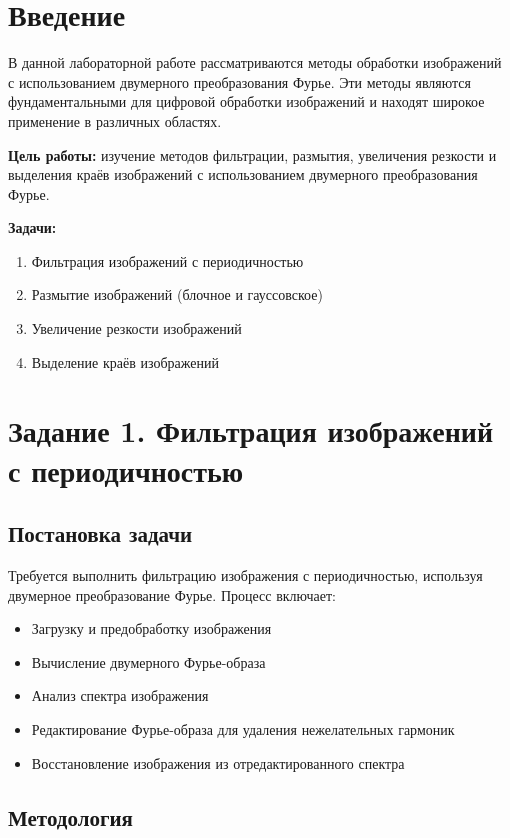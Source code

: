 \section*{Введение}

В данной лабораторной работе рассматриваются методы обработки изображений с использованием двумерного преобразования Фурье. Эти методы являются фундаментальными для цифровой обработки изображений и находят широкое применение в различных областях.

\textbf{Цель работы:} изучение методов фильтрации, размытия, увеличения резкости и выделения краёв изображений с использованием двумерного преобразования Фурье.

\textbf{Задачи:}
\begin{enumerate}
    \item Фильтрация изображений с периодичностью
    \item Размытие изображений (блочное и гауссовское)
    \item Увеличение резкости изображений
    \item Выделение краёв изображений
\end{enumerate}

\section*{Задание 1. Фильтрация изображений с периодичностью}

\subsection*{Постановка задачи}

Требуется выполнить фильтрацию изображения с периодичностью, используя двумерное преобразование Фурье. Процесс включает:
\begin{itemize}
    \item Загрузку и предобработку изображения
    \item Вычисление двумерного Фурье-образа
    \item Анализ спектра изображения
    \item Редактирование Фурье-образа для удаления нежелательных гармоник
    \item Восстановление изображения из отредактированного спектра
\end{itemize}

\subsection*{Методология}

